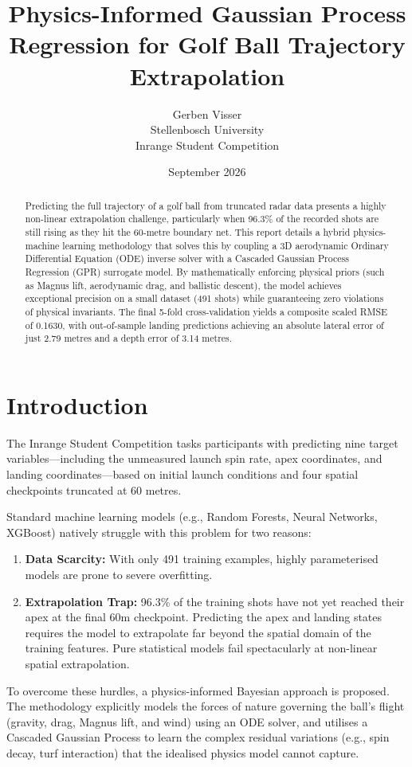 \documentclass[11pt, a4paper]{article}
\title{\textbf{Physics-Informed Gaussian Process Regression for Golf Ball Trajectory Extrapolation}}
\author{Gerben Visser \\ Stellenbosch University \\ Inrange Student Competition}
\date{September 2026}
\begin{document}
\maketitle

\begin{abstract}
Predicting the full trajectory of a golf ball from truncated radar data presents a highly non-linear extrapolation challenge, particularly when 96.3\% of the recorded shots are still rising as they hit the 60-metre boundary net. This report details a hybrid physics-machine learning methodology that solves this by coupling a 3D aerodynamic Ordinary Differential Equation (ODE) inverse solver with a Cascaded Gaussian Process Regression (GPR) surrogate model. By mathematically enforcing physical priors (such as Magnus lift, aerodynamic drag, and ballistic descent), the model achieves exceptional precision on a small dataset (491 shots) while guaranteeing zero violations of physical invariants. The final 5-fold cross-validation yields a composite scaled RMSE of 0.1630, with out-of-sample landing predictions achieving an absolute lateral error of just 2.79 metres and a depth error of 3.14 metres.
\end{abstract}

\section{Introduction}
The Inrange Student Competition tasks participants with predicting nine target variables—including the unmeasured launch spin rate, apex coordinates, and landing coordinates—based on initial launch conditions and four spatial checkpoints truncated at 60 metres. 

Standard machine learning models (e.g., Random Forests, Neural Networks, XGBoost) natively struggle with this problem for two reasons:
\begin{enumerate}
    \item \textbf{Data Scarcity:} With only 491 training examples, highly parameterised models are prone to severe overfitting.
    \item \textbf{Extrapolation Trap:} 96.3\% of the training shots have not yet reached their apex at the final 60m checkpoint. Predicting the apex and landing states requires the model to extrapolate far beyond the spatial domain of the training features. Pure statistical models fail spectacularly at non-linear spatial extrapolation.
\end{enumerate}

To overcome these hurdles, a physics-informed Bayesian approach is proposed. 
The methodology explicitly models the forces of nature governing the ball's flight (gravity, drag, Magnus lift, and wind) using an ODE solver, and utilises a Cascaded Gaussian Process to learn the complex residual variations (e.g., spin decay, turf interaction) that the idealised physics model cannot capture.
\end{document}
